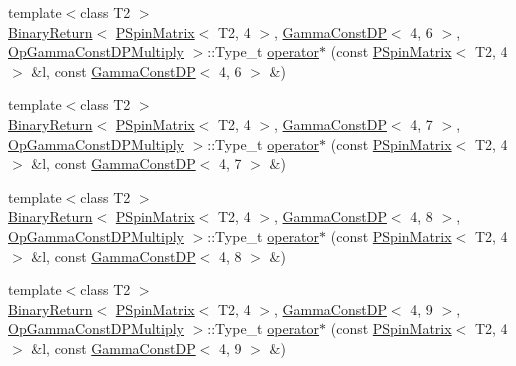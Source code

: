 \begin{DoxyCompactItemize}
\item 
{\footnotesize template$<$class T2 $>$ }\\\mbox{\hyperlink{structENSEM_1_1BinaryReturn}{Binary\+Return}}$<$ \mbox{\hyperlink{classENSEM_1_1PSpinMatrix}{P\+Spin\+Matrix}}$<$ T2, 4 $>$, \mbox{\hyperlink{classENSEM_1_1GammaConstDP}{Gamma\+Const\+DP}}$<$ 4, 6 $>$, \mbox{\hyperlink{structENSEM_1_1OpGammaConstDPMultiply}{Op\+Gamma\+Const\+D\+P\+Multiply}} $>$\+::Type\+\_\+t \mbox{\hyperlink{group__primspinmatrix_gac2a770f56cbf8ef3fd61c80d05ee306e}{operator$\ast$}} (const \mbox{\hyperlink{classENSEM_1_1PSpinMatrix}{P\+Spin\+Matrix}}$<$ T2, 4 $>$ \&l, const \mbox{\hyperlink{classENSEM_1_1GammaConstDP}{Gamma\+Const\+DP}}$<$ 4, 6 $>$ \&)
\item 
{\footnotesize template$<$class T2 $>$ }\\\mbox{\hyperlink{structENSEM_1_1BinaryReturn}{Binary\+Return}}$<$ \mbox{\hyperlink{classENSEM_1_1PSpinMatrix}{P\+Spin\+Matrix}}$<$ T2, 4 $>$, \mbox{\hyperlink{classENSEM_1_1GammaConstDP}{Gamma\+Const\+DP}}$<$ 4, 7 $>$, \mbox{\hyperlink{structENSEM_1_1OpGammaConstDPMultiply}{Op\+Gamma\+Const\+D\+P\+Multiply}} $>$\+::Type\+\_\+t \mbox{\hyperlink{group__primspinmatrix_ga4540a205b423306c3a0d322e81d75d2d}{operator$\ast$}} (const \mbox{\hyperlink{classENSEM_1_1PSpinMatrix}{P\+Spin\+Matrix}}$<$ T2, 4 $>$ \&l, const \mbox{\hyperlink{classENSEM_1_1GammaConstDP}{Gamma\+Const\+DP}}$<$ 4, 7 $>$ \&)
\item 
{\footnotesize template$<$class T2 $>$ }\\\mbox{\hyperlink{structENSEM_1_1BinaryReturn}{Binary\+Return}}$<$ \mbox{\hyperlink{classENSEM_1_1PSpinMatrix}{P\+Spin\+Matrix}}$<$ T2, 4 $>$, \mbox{\hyperlink{classENSEM_1_1GammaConstDP}{Gamma\+Const\+DP}}$<$ 4, 8 $>$, \mbox{\hyperlink{structENSEM_1_1OpGammaConstDPMultiply}{Op\+Gamma\+Const\+D\+P\+Multiply}} $>$\+::Type\+\_\+t \mbox{\hyperlink{group__primspinmatrix_gaf745fe661bcdf107b27bf22e48d36d3e}{operator$\ast$}} (const \mbox{\hyperlink{classENSEM_1_1PSpinMatrix}{P\+Spin\+Matrix}}$<$ T2, 4 $>$ \&l, const \mbox{\hyperlink{classENSEM_1_1GammaConstDP}{Gamma\+Const\+DP}}$<$ 4, 8 $>$ \&)
\item 
{\footnotesize template$<$class T2 $>$ }\\\mbox{\hyperlink{structENSEM_1_1BinaryReturn}{Binary\+Return}}$<$ \mbox{\hyperlink{classENSEM_1_1PSpinMatrix}{P\+Spin\+Matrix}}$<$ T2, 4 $>$, \mbox{\hyperlink{classENSEM_1_1GammaConstDP}{Gamma\+Const\+DP}}$<$ 4, 9 $>$, \mbox{\hyperlink{structENSEM_1_1OpGammaConstDPMultiply}{Op\+Gamma\+Const\+D\+P\+Multiply}} $>$\+::Type\+\_\+t \mbox{\hyperlink{group__primspinmatrix_ga49c2bb9929a1c38be010fe8c661f3720}{operator$\ast$}} (const \mbox{\hyperlink{classENSEM_1_1PSpinMatrix}{P\+Spin\+Matrix}}$<$ T2, 4 $>$ \&l, const \mbox{\hyperlink{classENSEM_1_1GammaConstDP}{Gamma\+Const\+DP}}$<$ 4, 9 $>$ \&)

\end{DoxyCompactItemize}
